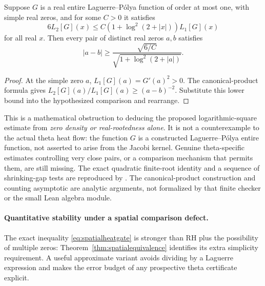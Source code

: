 \begin{corollary}
\label{cor:necessarygap}
Suppose $G$ is a real entire Laguerre--P\'olya
function of order at most one, with simple
real zeros, and for some $C>0$ it satisfies
\[
6L_2[G](x)
\le C\left(1+\log^2(2+|x|)\right)L_1[G](x)
\]
for all real $x$. Then every pair of distinct
real zeros $a,b$ satisfies
\begin{equation}
|a-b|\ge
\frac{\sqrt{6/C}}
{\sqrt{1+\log^2(2+|a|)}}.
\label{eq:necessarygap}
\end{equation}
\end{corollary}
\begin{proof}
At the simple zero $a$,
$L_1[G](a)=G'(a)^2>0$.
The canonical-product formula gives
$L_2[G](a)/L_1[G](a)
\ge(a-b)^{-2}$.
Substitute this lower bound into the
hypothesized comparison and rearrange.
\end{proof}

This is a mathematical obstruction to deducing the
proposed logarithmic-square estimate from
\emph{zero density or real-rootedness alone}.
It is not a counterexample to the actual theta
heat flow: the function $G$ is a constructed
Laguerre--P\'olya entire function, not asserted
to arise from the Jacobi kernel. Genuine
theta-specific estimates controlling very close
pairs, or a comparison mechanism that permits
them, are still missing. The exact quadratic
finite-root identity and a sequence of
shrinking-gap tests are reproduced by
.
The canonical-product construction and
counting asymptotic are analytic arguments,
not formalized by that finite checker or
the small Lean algebra module.

\paragraph{Quantitative stability under a spatial comparison defect.}
The exact inequality \eqref{eq:spatialheatgate}
is stronger than RH plus the possibility of multiple zeros:
Theorem~\ref{thm:spatialequivalence} identifies
its extra simplicity requirement. A useful
approximate variant avoids dividing by a
Laguerre expression and makes the error budget
of any prospective theta certificate explicit.

